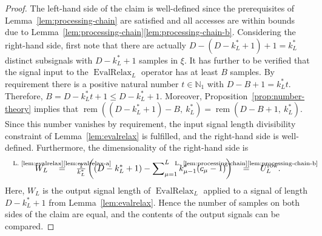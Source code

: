 \documentclass[journal]{IEEEtran}
\newcommand{\N}{\mathbb{N}}
\newcommand{\ROI}{B}
\newcommand{\rem}[2]{\operatorname{rem}(#1,\ #2)}
\newcommand{\row}{\operatorname{row}}
\newcommand{\equsing}[1]{\overset{\mathclap{\text{#1}}}{=}}
\DeclareMathOperator{\EvalRelax}{EvalRelax}
\begin{document}
\begin{theorem}
\end{theorem}\begin{proof}
The left-hand side of the claim is well-defined since the prerequisites of Lemma~\ref{lem:processing-chain} are satisfied and all accesses are within bounds due to Lemma~\ref{lem:processing-chain}\ref{lem:processing-chain-b}.
Considering the right-hand side, first note that there are actually $D - (D - k_L^* + 1) + 1 = k_L^*$ distinct subsignals with $D - k_L^* + 1$ samples in $\xi$.
It has further to be verified that the signal input to the $\EvalRelax_L$ operator has at least $\ROI$ samples.
By requirement there is a positive natural number $t\in\N_1$ with $D - \ROI + 1 = k_L^* t$.
Therefore, $\ROI = D - k_L^* t + 1 \leq D - k_L^* + 1$.
Moreover, Proposition~\ref{prop:number-theory} implies that $\rem{(D - k_L^* + 1) - \ROI}{k_L^*} = \rem{D - \ROI + 1}{k_L^*}$.
Since this number vanishes by requirement, the input signal length divisibility constraint of Lemma~\ref{lem:evalrelax} is fulfilled, and the right-hand side is well-defined.
Furthermore, the dimensionality of the right-hand side is
\begin{displaymath}
  W_L
  \ \ \ \equsing{L.~\ref{lem:evalrelax}\ref{lem:evalrelax-a}}\ \ \ \tfrac{1}{k_L^*}\left( (D - k_L^* + 1) - \sum\nolimits_{\mu = 1}^L k_{\mu - 1}^*(c_\mu - 1)\right)
  \ \ \ \equsing{L.~\ref{lem:processing-chain}\ref{lem:processing-chain-b}}\ \ \ U_L^{\row}\text{.}
\end{displaymath}
Here, $W_L$ is the output signal length of $\EvalRelax_L$ applied to a signal of length $D - k_L^* + 1$ from Lemma~\ref{lem:evalrelax}.
Hence the number of samples on both sides of the claim are equal, and the contents of the output signals can be compared.


\end{proof}
\end{document}
